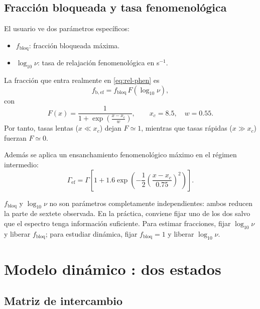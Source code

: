 \subsection{Fracción bloqueada y tasa fenomenológica}

El usuario ve dos parámetros específicos:
\begin{itemize}[leftmargin=*]
  \item $f_{\mathrm{bloq}}$: fracción bloqueada máxima.
  \item $\log_{10}\nu$: tasa de relajación fenomenológica en s$^{-1}$.
\end{itemize}
La fracción que entra realmente en \eqref{eq:rel-phen} es
\begin{equation}
  f_{\mathrm{b,ef}}=f_{\mathrm{bloq}}\,F(\log_{10}\nu),
  \label{eq:fb-eff}
\end{equation}
con
\begin{equation}
  F(x)=\frac{1}{1+\exp\left(\frac{x-x_c}{w}\right)},
  \qquad x_c=8.5,\quad w=0.55.
\end{equation}
Por tanto, tasas lentas ($x\ll x_c$) dejan $F\simeq 1$, mientras que tasas
rápidas ($x\gg x_c$) fuerzan $F\simeq 0$.

Además se aplica un ensanchamiento fenomenológico máximo en el régimen
intermedio:
\begin{equation}
  \Gamma_{\mathrm{ef}}=\Gamma\left[1+1.6\exp\left(-\frac{1}{2}
  \left(\frac{x-x_c}{0.75}\right)^2\right)\right].
\end{equation}

\begin{aviso}
$f_{\mathrm{bloq}}$ y $\log_{10}\nu$ no son parámetros completamente
independientes: ambos reducen la parte de sextete observada. En la práctica,
conviene fijar uno de los dos salvo que el espectro tenga información suficiente.
Para estimar fracciones, fijar $\log_{10}\nu$ y liberar $f_{\mathrm{bloq}}$; para
estudiar dinámica, fijar $f_{\mathrm{bloq}}=1$ y liberar $\log_{10}\nu$.
\end{aviso}

\section{Modelo dinámico : dos estados}

\subsection{Matriz de intercambio}

